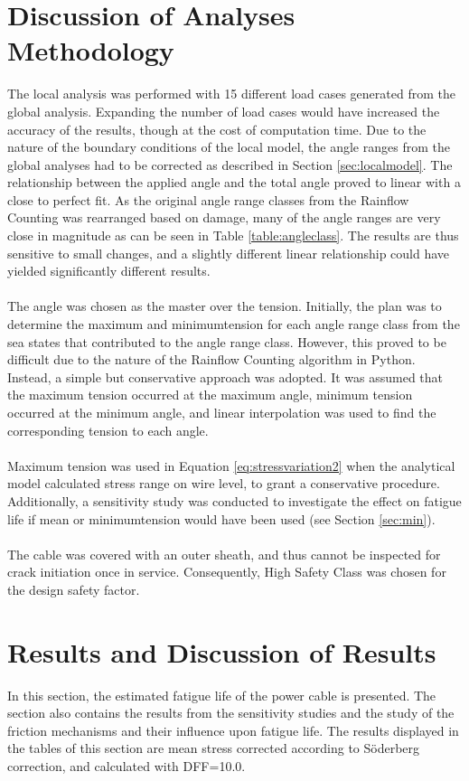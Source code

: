 \section{Discussion of Analyses Methodology}
The local analysis was performed with 15 different load cases generated from the global analysis. Expanding the number of load cases would have increased the accuracy of the results, though at the cost of computation time. Due to the nature of the boundary conditions of the local model, the angle ranges from the global analyses had to be corrected as described in Section \ref{sec:localmodel}. The relationship between the applied angle and the total angle proved to linear with a close to perfect fit. As the original angle range classes from the Rainflow Counting was rearranged based on damage, many of the angle ranges are very close in magnitude as can be seen in Table \ref{table:angleclass}. The results are thus sensitive to small changes, and a slightly different linear relationship could have yielded significantly different results. \\\\ The angle was chosen as the master over the tension. Initially, the plan was to determine the maximum and minimumtension for each angle range class from the sea states that contributed to the angle range class. However, this proved to be difficult due to the nature of the Rainflow Counting algorithm in Python. Instead, a simple but conservative approach was adopted. It was assumed that the maximum tension occurred at the maximum angle, minimum tension occurred at the minimum angle, and linear interpolation was used to find the corresponding tension to each angle.\\\\ Maximum tension was used in Equation \ref{eq:stressvariation2} when the analytical model calculated stress range on wire level, to grant a conservative procedure. Additionally, a sensitivity study was conducted to investigate the effect on fatigue life if mean or minimumtension would have been used (see Section \ref{sec:min}). \\\\ The cable was covered with an outer sheath, and thus cannot be inspected for crack initiation once in service. Consequently, High Safety Class was chosen for the design safety factor. 

\section{Results and Discussion of Results}
In this section, the estimated fatigue life of the power cable is presented. The section also contains the results from the sensitivity studies and the study of the friction mechanisms and their influence upon fatigue life. The results displayed in the tables of this section are mean stress corrected according to Söderberg correction, and calculated with DFF=10.0.\\\\

